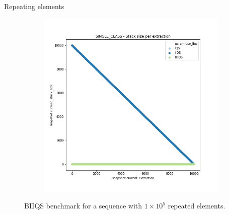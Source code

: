 \documentclass{beamer}
\begin{document}
\begin{frame}{Repeating elements}
\begin{figure}
\begin{subfigure}[b]{\textwidth}
            \includegraphics[height=0.4\textheight]{chapter5/01-basebenchmark-04-single-class.png.2-0.png}
        \end{subfigure}
        \caption{BIIQS benchmark for a sequence with $1\times10^5$ repeated elements.}
    \end{figure}
\end{frame}
\end{document}
